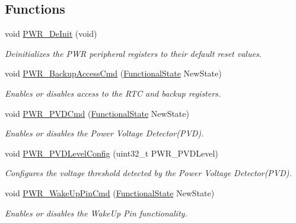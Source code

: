 \subsection*{Functions}
\begin{DoxyCompactItemize}
\item 
void \hyperlink{group___p_w_r___exported___functions_gad03a0aac7bc3bc3a9fd012f3769a6990}{P\+W\+R\+\_\+\+De\+Init} (void)
\begin{DoxyCompactList}\small\item\em Deinitializes the P\+WR peripheral registers to their default reset values. \end{DoxyCompactList}\item 
void \hyperlink{group___p_w_r___exported___functions_ga0741aea35572b1a75f82b74de12df800}{P\+W\+R\+\_\+\+Backup\+Access\+Cmd} (\hyperlink{group___exported__types_gac9a7e9a35d2513ec15c3b537aaa4fba1}{Functional\+State} New\+State)
\begin{DoxyCompactList}\small\item\em Enables or disables access to the R\+TC and backup registers. \end{DoxyCompactList}\item 
void \hyperlink{group___p_w_r___exported___functions_ga42cad476b816e0a33594a933b3ed1acd}{P\+W\+R\+\_\+\+P\+V\+D\+Cmd} (\hyperlink{group___exported__types_gac9a7e9a35d2513ec15c3b537aaa4fba1}{Functional\+State} New\+State)
\begin{DoxyCompactList}\small\item\em Enables or disables the Power Voltage Detector(\+P\+V\+D). \end{DoxyCompactList}\item 
void \hyperlink{group___p_w_r___exported___functions_ga237c143ef6aa55abb8049fa7bf24ab8f}{P\+W\+R\+\_\+\+P\+V\+D\+Level\+Config} (uint32\+\_\+t P\+W\+R\+\_\+\+P\+V\+D\+Level)
\begin{DoxyCompactList}\small\item\em Configures the voltage threshold detected by the Power Voltage Detector(\+P\+V\+D). \end{DoxyCompactList}\item 
void \hyperlink{group___p_w_r___exported___functions_gae5fd6f9336ef8c60d5483651cb0d1a00}{P\+W\+R\+\_\+\+Wake\+Up\+Pin\+Cmd} (\hyperlink{group___exported__types_gac9a7e9a35d2513ec15c3b537aaa4fba1}{Functional\+State} New\+State)
\begin{DoxyCompactList}\small\item\em Enables or disables the Wake\+Up Pin functionality. \end{DoxyCompactList}\item 

\end{DoxyCompactItemize}
